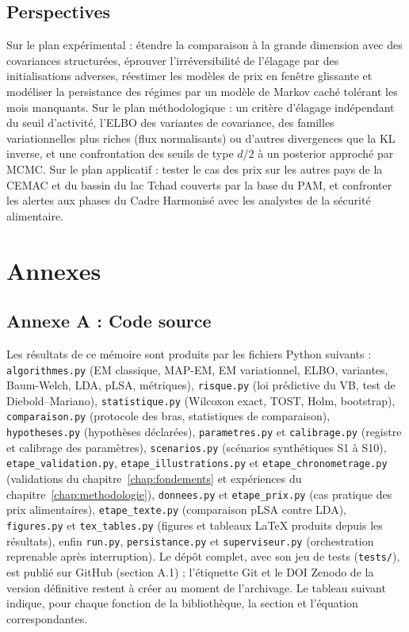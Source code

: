 \section*{Perspectives}
Sur le plan expérimental : étendre la comparaison à la grande dimension avec des covariances structurées, éprouver l'irréversibilité de l'élagage par des initialisations adverses, réestimer les modèles de prix en fenêtre glissante et modéliser la persistance des régimes par un modèle de Markov caché tolérant les mois manquants. Sur le plan méthodologique : un critère d'élagage indépendant du seuil d'activité, l'ELBO des variantes de covariance, des familles variationnelles plus riches (flux normalisants) ou d'autres divergences que la KL inverse, et une confrontation des seuils de type $d/2$ à un posterior approché par MCMC. Sur le plan applicatif : tester le cas des prix sur les autres pays de la CEMAC et du bassin du lac Tchad couverts par la base du PAM, et confronter les alertes aux phases du Cadre Harmonisé avec les analystes de la sécurité alimentaire.

\printbibliography[title={Bibliographie}, heading=bibintoc]


\chapter*{Annexes}
\section*{Annexe A : Code source}
Les résultats de ce mémoire sont produits par les fichiers Python suivants : \texttt{algorithmes.py} (EM classique, MAP-EM, EM variationnel, ELBO, variantes, Baum-Welch, LDA, pLSA, métriques), \texttt{risque.py} (loi prédictive du VB, test de Diebold--Mariano), \texttt{statistique.py} (Wilcoxon exact, TOST, Holm, bootstrap), \texttt{comparaison.py} (protocole des bras, statistiques de comparaison), \texttt{hypotheses.py} (hypothèses déclarées), \texttt{parametres.py} et \texttt{calibrage.py} (registre et calibrage des paramètres), \texttt{scenarios.py} (scénarios synthétiques S1 à S10), \texttt{etape\_validation.py}, \texttt{etape\_illustrations.py} et \texttt{etape\_chronometrage.py} (validations du chapitre~\ref{chap:fondements} et expériences du chapitre~\ref{chap:methodologie}), \texttt{donnees.py} et \texttt{etape\_prix.py} (cas pratique des prix alimentaires), \texttt{etape\_texte.py} (comparaison pLSA contre LDA), \texttt{figures.py} et \texttt{tex\_tables.py} (figures et tableaux \LaTeX{} produits depuis les résultats), enfin \texttt{run.py}, \texttt{persistance.py} et \texttt{superviseur.py} (orchestration reprenable après interruption). Le dépôt complet, avec son jeu de tests (\texttt{tests/}), est publié sur GitHub (section A.1) ; l'étiquette Git et le DOI Zenodo de la version définitive restent à créer au moment de l'archivage. Le tableau suivant indique, pour chaque fonction de la bibliothèque, la section et l'équation correspondantes.

